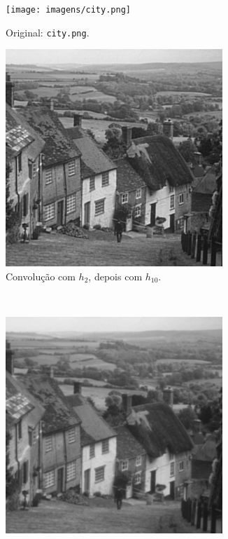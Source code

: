 \begin{figure}[H]
    \centering
    \begin{subfigure}{0.48\textwidth}
        \centering
        \texttt{[image: imagens/city.png]}
        \caption{Original: \texttt{city.png}.}
        \label{fig:sharpen:orig}
    \end{subfigure}%
    \begin{subfigure}{0.48\textwidth}
        \centering
        \includegraphics[width=0.9\textwidth]{resultados/city_h2h10.png}
        \caption{Convolução com $h_2$, depois com $h_{10}$.}
        \label{fig:sharpen:combinada}
    \end{subfigure}\\[8pt]
    \begin{subfigure}{0.48\textwidth}
        \centering
        \includegraphics[width=0.9\textwidth]{resultados/city_h2.png}

\end{subfigure}
\end{figure}
